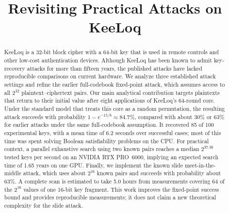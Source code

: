 \documentclass[version=preprint]{iacrcc}
\title[running = {Revisiting Practical Attacks on KeeLoq}]{Revisiting Practical Attacks on KeeLoq}
\begin{document}
\maketitle


\begin{abstract}
KeeLoq is a 32-bit block cipher with a 64-bit key that is used in remote controls and other low-cost authentication devices.
Although KeeLoq has been known to admit key-recovery attacks for more than fifteen years, the published attacks have lacked reproducible comparisons on current hardware.
We analyze three established attack settings and refine the earlier full-codebook fixed-point attack, which assumes access to all $2^{32}$ plaintext--ciphertext pairs.
Our main analytical contribution targets plaintexts that return to their initial value after eight applications of KeeLoq's 64-round core.
Under the standard model that treats this core as a random permutation, the resulting attack succeeds with probability $1-e^{-15/8}\approx84.7\%$, compared with about $30\%$ or $63\%$ for earlier attacks under the same full-codebook assumption.
It recovered 85 of 100 experimental keys, with a mean time of 6.2 seconds over successful cases; most of this time was spent solving Boolean satisfiability problems on the CPU.
For practical context, a parallel exhaustive search using two known pairs reaches a median $2^{37.36}$ tested keys per second on an NVIDIA RTX PRO~6000, implying an expected search time of 1.65 years on one GPU.
Finally, we implement the known slide meet-in-the-middle attack, which uses about $2^{16}$ known pairs and succeeds with probability about $63\%$.
A complete scan is estimated to take 5.0 hours from measurements covering 64 of the $2^{16}$ values of one 16-bit key fragment.
This work improves the fixed-point success bound and provides reproducible measurements; it does not claim a new theoretical complexity for the slide attack.
\end{abstract}
\end{document}
